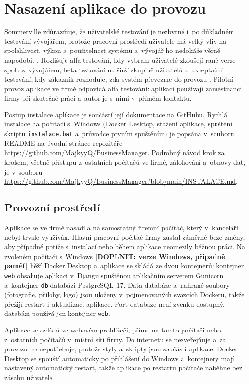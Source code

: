 \section{Nasazení aplikace do provozu}\label{sec:nasazeni}

Sommerville zdůrazňuje, že uživatelské testování je nezbytné i~po důkladném testování vývojářem, protože pracovní prostředí uživatele má velký vliv na spolehlivost, výkon a~použitelnost systému a~vývojář ho nedokáže věrně napodobit \cite[s.~249]{Sommerville2016}. Rozlišuje alfa testování, kdy vybraní uživatelé zkoušejí rané verze spolu s~vývojářem, beta testování na širší skupině uživatelů a~akceptační testování, kdy zákazník rozhoduje, zda systém převezme do provozu \cite[s.~249--250]{Sommerville2016}. Pilotní provoz aplikace ve firmě odpovídá alfa testování: aplikaci používají zaměstnanci firmy při skutečné práci a~autor je s~nimi v~přímém kontaktu.

Postup instalace aplikace je součástí její dokumentace na GitHubu. Rychlá instalace na počítači s~Windows (Docker Desktop, stažení aplikace, spuštění skriptu \texttt{instalace.bat} a~průvodce prvním spuštěním) je popsána v~souboru README na úvodní stránce repozitáře \url{https://github.com/MajkyyQ/BusinessManager}. Podrobný návod krok za krokem, včetně přístupu z~ostatních počítačů ve firmě, zálohování a~obnovy dat, je v~souboru \url{https://github.com/MajkyyQ/BusinessManager/blob/main/INSTALACE.md}.

\subsection{Provozní prostředí}

Aplikace se ve firmě nasadila na samostatný firemní počítač, který v~kanceláři nebyl trvale využíván. Hlavní pracovní počítač firmy zůstal záměrně beze změny, aby případné potíže s~instalací nebo během aplikace neomezily běžnou práci. Na zvoleném počítači s~Windows \textbf{[DOPLNIT: verze Windows, případně paměť]} běží Docker Desktop a~aplikace se skládá ze dvou kontejnerů: kontejner \texttt{web} obsahuje aplikaci v~Djangu spuštěnou aplikačním serverem Gunicorn a~kontejner \texttt{db} databázi PostgreSQL~17. Data databáze a~nahrané soubory (fotografie, přílohy, logo) jsou uloženy v~pojmenovaných svazcích Dockeru, takže přežijí restart i~aktualizaci aplikace. Port databáze není zvenku dostupný, databázi používá jen kontejner \texttt{web}.

Aplikace se ovládá ve webovém prohlížeči, přímo na tomto počítači nebo z~ostatních počítačů v~místní síti firmy. Do internetu se nezveřejňuje a~za provozu ho nepotřebuje, protože styly a~skripty jsou součástí aplikace. Docker Desktop se spouští automaticky po přihlášení do Windows a~kontejnery mají nastavený automatický restart, takže aplikace po restartu počítače naběhne bez zásahu uživatele.

